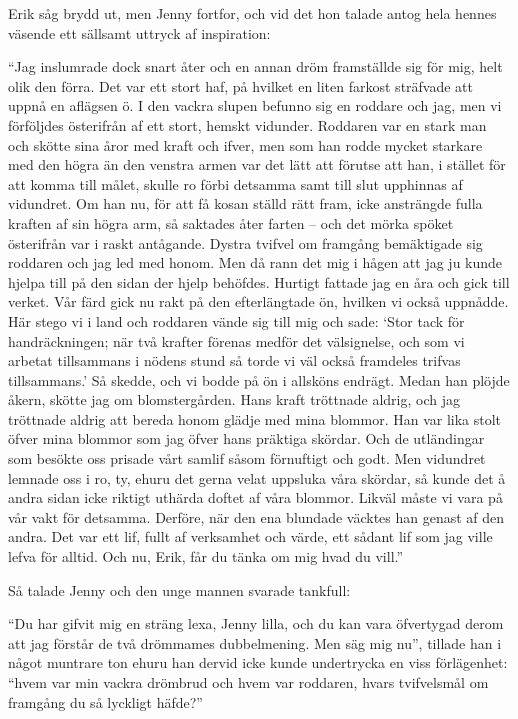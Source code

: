 Erik såg brydd ut, men Jenny fortfor, och vid det hon talade antog hela
hennes väsende ett sällsamt uttryck af inspiration:

``Jag inslumrade dock snart åter och en annan dröm framställde sig för
mig, helt olik den förra. Det var ett stort haf, på hvilket en liten
farkost sträfvade att uppnå en aflägsen ö. I den vackra slupen befunno
sig en roddare och jag, men vi förföljdes österifrån af ett stort,
hemskt vidunder. Roddaren var en stark man och skötte sina åror med
kraft och ifver, men som han rodde mycket starkare med den högra än den
venstra armen var det lätt att förutse att han, i stället för att komma
till målet, skulle ro förbi detsamma samt till slut upphinnas af
vidundret. Om han nu, för att få kosan ställd rätt fram, icke ansträngde
fulla kraften af sin högra arm, så saktades åter farten -- och det mörka
spöket österifrån var i raskt antågande. Dystra tvifvel om framgång
bemäktigade sig roddaren och jag led med honom. Men då rann det mig i
hågen att jag ju kunde hjelpa till på den sidan der hjelp behöfdes.
Hurtigt fattade jag en åra och gick till verket. Vår färd gick nu rakt
på den efterlängtade ön, hvilken vi också uppnådde. Här stego vi i land
och roddaren vände sig till mig och sade: `Stor tack för handräckningen;
när två krafter förenas medför det välsignelse, och som vi arbetat
tillsammans i nödens stund så torde vi väl också framdeles trifvas
tillsammans.' Så skedde, och vi bodde på ön i allsköns endrägt. Medan
han plöjde åkern, skötte jag om blomstergården. Hans kraft tröttnade
aldrig, och jag tröttnade aldrig att bereda honom glädje med mina
blommor. Han var lika stolt öfver mina blommor som jag öfver hans
präktiga skördar. Och de utländingar som besökte oss prisade vårt samlif
såsom förnuftigt och godt. Men vidundret lemnade oss i ro, ty, ehuru det
gerna velat uppsluka våra skördar, så kunde det å andra sidan icke
riktigt uthärda doftet af våra blommor. Likväl måste vi vara på vår vakt
för detsamma. Derföre, när den ena blundade väcktes han genast af den
andra. Det var ett lif, fullt af verksamhet och värde, ett sådant lif
som jag ville lefva för alltid. Och nu, Erik, får du tänka om mig hvad
du vill.''

Så talade Jenny och den unge mannen svarade tankfull:

``Du har gifvit mig en sträng lexa, Jenny lilla, och du kan vara
öfvertygad derom att jag förstår de två drömmames dubbelmening. Men säg
mig nu'', tillade han i något muntrare ton ehuru han dervid icke kunde
undertrycka en viss förlägenhet: ``hvem var min vackra drömbrud och hvem
var roddaren, hvars tvifvelsmål om framgång du så lyckligt häfde?''

